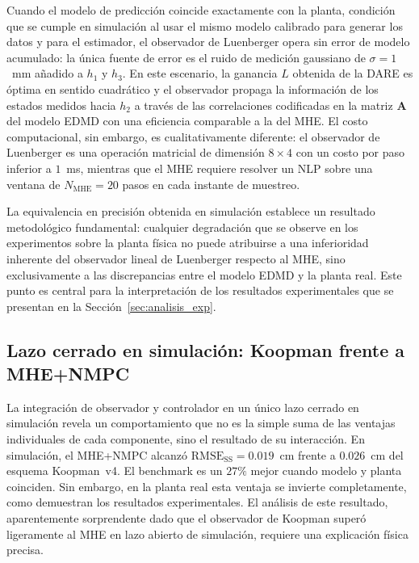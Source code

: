 \documentclass[12pt,letterpaper]{article}
\begin{document}
Cuando el modelo de predicción coincide exactamente con la planta,
condición que se cumple en simulación al usar el mismo modelo
calibrado para generar los datos y para el estimador, el observador
de Luenberger opera sin error de modelo acumulado: la única fuente
de error es el ruido de medición gaussiano de $\sigma = 1$~mm 
añadido a $h_1$ y $h_3$. En este escenario, la ganancia $L$ obtenida 
de la DARE es óptima en sentido cuadrático y el observador propaga 
la información de los estados medidos hacia $h_2$ a través de las 
correlaciones codificadas en la matriz $\mathbf{A}$ del modelo EDMD 
con una eficiencia comparable a la del MHE. El costo computacional, 
sin embargo, es cualitativamente diferente: el observador de 
Luenberger es una operación matricial de dimensión $8 \times 4$ con 
un costo por paso inferior a $1$~ms, mientras que el MHE requiere 
resolver un NLP sobre una ventana de $N_{\mathrm{MHE}} = 20$ pasos 
en cada instante de muestreo.

La equivalencia en precisión obtenida en simulación establece un 
resultado metodológico fundamental: cualquier degradación que se 
observe en los experimentos sobre la planta física no puede 
atribuirse a una inferioridad inherente del observador lineal de 
Luenberger respecto al MHE, sino exclusivamente a las discrepancias 
entre el modelo EDMD y la planta real. Este punto es central para 
la interpretación de los resultados experimentales que se presentan 
en la Sección~\ref{sec:analisis_exp}.

\subsection{Lazo cerrado en simulación: Koopman frente a MHE+NMPC}
\label{sec:analisis_sim_cl}
La integración de observador y controlador en un único lazo cerrado 
en simulación revela un comportamiento que no es la simple suma de 
las ventajas individuales de cada componente, sino el resultado de 
su interacción. En simulación, el MHE+NMPC alcanzó $\mathrm{RMSE}_{\mathrm{SS}} =
0.019$~cm frente a $0.026$~cm del esquema Koopman~v4. El benchmark
es un $27\%$ mejor cuando modelo y planta coinciden. Sin embargo, en
la planta real esta ventaja se invierte completamente, como demuestran
los resultados experimentales. El análisis de este resultado,
aparentemente sorprendente dado que el observador de Koopman superó
ligeramente al MHE en lazo abierto de simulación, requiere una explicación
física precisa.
\end{document}
